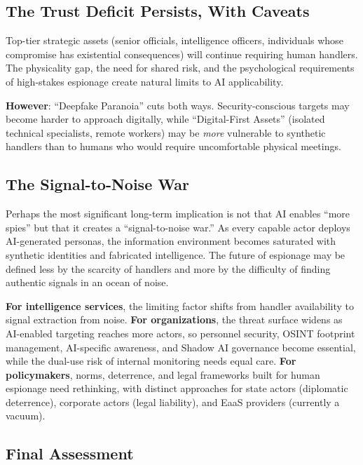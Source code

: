 \documentclass[11pt,letterpaper]{article}
\begin{document}
\subsection{The Trust Deficit Persists, With Caveats}

Top-tier strategic assets (senior officials, intelligence officers, individuals whose compromise has existential consequences) will continue requiring human handlers. The physicality gap, the need for shared risk, and the psychological requirements of high-stakes espionage create natural limits to AI applicability.

\textbf{However}: ``Deepfake Paranoia'' cuts both ways. Security-conscious targets may become harder to approach digitally, while ``Digital-First Assets'' (isolated technical specialists, remote workers) may be \textit{more} vulnerable to synthetic handlers than to humans who would require uncomfortable physical meetings.

\subsection{The Signal-to-Noise War}

Perhaps the most significant long-term implication is not that AI enables ``more spies'' but that it creates a ``signal-to-noise war.'' As every capable actor deploys AI-generated personas, the information environment becomes saturated with synthetic identities and fabricated intelligence. The future of espionage may be defined less by the scarcity of handlers and more by the difficulty of finding authentic signals in an ocean of noise.

\textbf{For intelligence services}, the limiting factor shifts from handler availability to signal extraction from noise. \textbf{For organizations}, the threat surface widens as AI-enabled targeting reaches more actors, so personnel security, OSINT footprint management, AI-specific awareness, and Shadow AI governance become essential, while the dual-use risk of internal monitoring needs equal care. \textbf{For policymakers}, norms, deterrence, and legal frameworks built for human espionage need rethinking, with distinct approaches for state actors (diplomatic deterrence), corporate actors (legal liability), and EaaS providers (currently a vacuum).

\subsection{Final Assessment}
\end{document}
